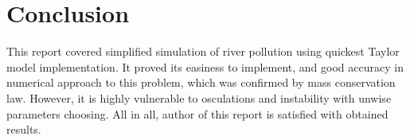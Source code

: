 \documentclass[onecolumn]{article}
\begin{document}
\section{Conclusion}
This report covered simplified simulation of river pollution using quickest Taylor model implementation. It proved its easiness to implement, and good accuracy in numerical approach to this problem, which was confirmed by mass conservation law. However, it is highly vulnerable to osculations and instability with unwise parameters choosing. All in all, author of this report is satisfied with obtained results.
\end{document}
